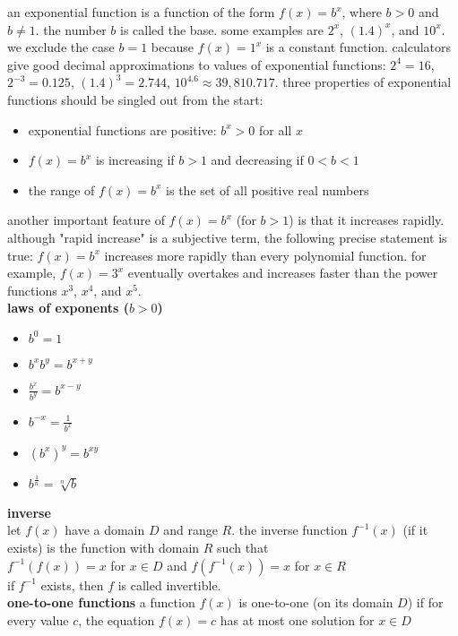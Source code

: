 \documentclass{article}
\begin{document}
an exponential function is a function of the form $f(x) = b^x$, where $b > 0$ and $b \neq 1$. the number $b$ is called the base. some examples are $2^x$, $(1.4)^x$, and $10^x$. we exclude the case $b = 1$ because $f(x) = 1^x$ is a constant function. calculators give good decimal approximations to values of exponential functions: $2^4 = 16$, $2^{-3} = 0.125$, $(1.4)^3 = 2.744$, $10^{4.6} \approx 39,810.717$. three properties of exponential functions should be singled out from the start:
	\begin{itemize}
		\item exponential functions are positive: $b^x > 0$ for all $x$
		\item $f(x) = b^x$ is increasing if $b > 1$ and decreasing if $0 < b < 1$
		\item the range of $f(x) = b^x$ is the set of all positive real numbers
	\end{itemize}
another important feature of $f(x) = b^x$ (for $b > 1$) is that it increases rapidly. although "rapid increase" is a subjective term, the following precise statement is true: $f(x) = b^x$ increases more rapidly than every polynomial function. for example, $f(x) = 3^x$ eventually overtakes and increases faster than the power functions $x^3$, $x^4$, and $x^5$.\\

\textbf{laws of exponents ($b > 0$)}
	\begin{itemize}
		\item $b^0 = 1$
		\item $b^xb^y = b^{x + y}$
		\item $\frac{b^x}{b^y} = b^{x - y}$
		\item $b^{-x} = \frac{1}{b^x}$
		\item $(b^x)^y = b^{xy}$
		\item $b^{\frac{1}{n}} = \sqrt[n]{b}$
	\end{itemize}

\textbf{inverse}\\
let $f(x)$ have a domain $D$ and range $R$. the inverse function $f^{-1}(x)$ (if it exists) is the function with domain $R$ such that\\ $f^{-1}(f(x)) = x$ for $x \in D$ and $f(f^{-1}(x)) = x$ for $x \in R$\\ if $f^{-1}$ exists, then $f$ is called invertible.\\

\textbf{one-to-one functions} a function $f(x)$ is one-to-one (on its domain $D$) if for every value $c$, the equation $f(x) = c$ has at most one solution for $x \in D$\\
\end{document}
